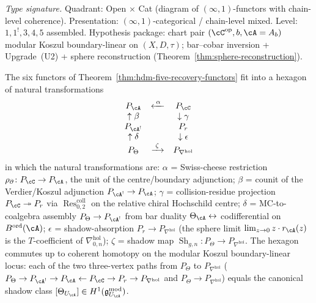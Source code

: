 \begin{theorem}
\label{thm:hdm-hexagon}
\emph{Type signature.} Quadrant: Open $\times$ Cat
(diagram of $(\infty,1)$-functors with chain-level coherence).
Presentation: $(\infty,1)$-categorical / chain-level mixed.
Level: $1, 1^!, 3, 4, 5$ assembled. Hypothesis package: chart pair
$(\cC^{\mathrm{op}}, b, \cA = A_b)$ modular Koszul boundary-linear on
$(X, D, \tau)$; bar--cobar inversion + Upgrade~\textup{(U2)} +
sphere reconstruction
\textup{(}Theorem~\textup{\ref{thm:sphere-reconstruction}}\textup{).}

The six functors of Theorem~\ref{thm:hdm-five-recovery-functors}
fit into a hexagon of natural transformations
\[
\begin{array}{ccc}
P_\cA & \xleftarrow{\;\alpha\;} & P_\cC \\
\uparrow \beta & & \downarrow \gamma \\
P_{\cA^!} & & P_r \\
\uparrow \delta & & \downarrow \epsilon \\
P_\Theta & \xrightarrow{\;\zeta\;} & P_{\nabla^{\mathrm{hol}}}
\end{array}
\]
in which the natural transformations are:
$\alpha$ = Swiss-cheese restriction
$\rho_\partial\colon P_\cC\to P_\cA$, the unit of the
centre/boundary adjunction;
$\beta$ = counit of the Verdier/Koszul adjunction
$P_{\cA^!}\to P_\cA$;
$\gamma$ = collision-residue projection
$P_\cC\twoheadrightarrow P_r$ via
$\operatorname{Res}^{\mathrm{coll}}_{0,2}$ on the relative chiral
Hochschild centre;
$\delta$ = MC-to-coalgebra assembly
$P_\Theta\to P_{\cA^!}$ from bar duality
$\Theta_\cA\leftrightarrow$ codifferential on $B^{\mathrm{ord}}(\cA)$;
$\epsilon$ = shadow-absorption
$P_r\to P_{\nabla^{\mathrm{hol}}}$ (the sphere limit
$\lim_{z\to0}z\cdot r_\cA(z)$ is the $T$-coefficient of
$\nabla^{\mathrm{hol}}_{0,n}$);
$\zeta$ = shadow map
$\operatorname{Sh}_{g,n}\colon P_\Theta\to P_{\nabla^{\mathrm{hol}}}$.
The hexagon commutes up to coherent homotopy on the modular Koszul
boundary-linear locus: each of the two three-vertex paths from
$P_\Theta$ to $P_{\nabla^{\mathrm{hol}}}$
\textup{(}$P_\Theta\to P_{\cA^!}\to P_\cA\leftarrow P_\cC\to
P_r\to P_{\nabla^{\mathrm{hol}}}$ and $P_\Theta\to
P_{\nabla^{\mathrm{hol}}}$\textup{)} equals the canonical shadow
class
$[\Theta_{U_\cA}]\in H^1(\mathfrak g^{\mathrm{mod}}_{U_\cA})$.
\end{theorem}

